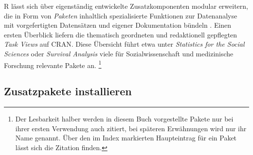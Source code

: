 R lässt sich über eigenständig entwickelte Zusatzkomponenten modular erweitern, die in Form von \emph{Paketen} inhaltlich spezialisierte Funktionen zur Datenanalyse mit vorgefertigten Datensätzen und eigener Dokumentation bündeln \cite{Ligges2003a}. %
Einen ersten Überblick liefern die thematisch geordneten und redaktionell gepflegten \emph{Task Views} auf CRAN. Diese Übersicht führt etwa unter \emph{Statistics for the Social Sciences} \cite{CRANtvSocSci} oder \emph{Survival Analysis} \cite{CRANtvSurvival} viele für Sozialwissenschaft und medizinische Forschung relevante Pakete an.%
\footnote{Der Lesbarkeit halber werden in diesem Buch vorgestellte Pakete nur bei ihrer ersten Verwendung auch zitiert, bei späteren Erwähnungen wird nur ihr Name genannt. Über den im Index markierten Haupteintrag für ein Paket lässt sich die Zitation finden.}

\subsection{Zusatzpakete installieren}

